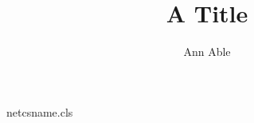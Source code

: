 \begin{filecontents*}[overwrite]{netcsname.cls}
\newcommand\corr[1]{\expandafter\gdef\csname nc@corr\endcsname{#1}}
\renewcommand\maketitle{\par\begingroup\centering{\Large\@title\par}%
  {\@author\thanks{Corresponding author: \csname nc@corr\endcsname}\par}\@thanks\endgroup}
\end{filecontents*}
\documentclass{netcsname}

\title{A Title}
\author{Ann Able}
\maketitle
Text.

